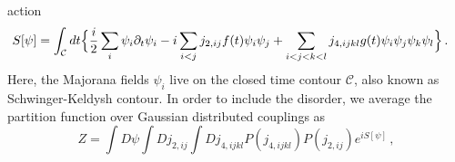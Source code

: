 \documentclass[prx,aps,onecolumn,amsfonts,showpacs,superscriptaddress,preprint,eqsecnum]
{revtex4-1}
\begin{document}
action
\begin{equation}
\begin{split}
	S[\psi] &= \int_{\mathcal C} d t \Bigl\{\frac{i}{2} \sum_i \psi_i \partial_t 
\psi_i - i \sum_{i < j} j_{2,ij} f(t) \psi_i \psi_j + \sum_{i<j<k<l} j_{4,ijkl} 
g(t) \psi_i 
\psi_j \psi_k \psi_l\Bigr\} \,.
\label{eq:CTP_Action}
\end{split}
\end{equation}
Here, the Majorana fields $\psi_i$ live on the closed time contour $\mathcal{C}$,
also known as Schwinger-Keldysh contour.
In order to include the disorder, we average the partition function over 
Gaussian distributed couplings as
\begin{equation}
	Z = \int D\psi \int Dj_{2,ij} \int Dj_{4,ijkl} P(j_{4,ijkl}) P(j_{2,ij}) e^{i 
S[\psi]} \, ,
\end{equation}
\end{document}
